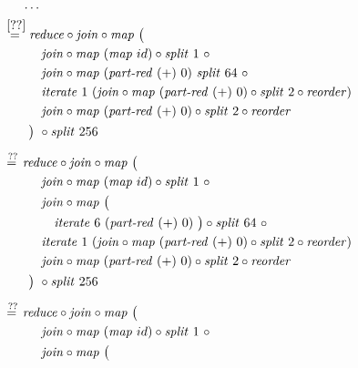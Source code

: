\begin{figure*}[t]
\begin{align*}
  &\hspace{.5em}\ldots\\
%
  &\hspace{-2em}\quad\begin{aligned}
    &\overset{\ref{??}}{=\hspace{.2em}}
      \reduce \circ \join \circ \map\ \big(\\
    &\qquad\quad\join \circ \map\ (\map\ id) \circ \splitN\ 1\ \circ\\
    &\qquad\quad\join \circ \map\ (\partRed\ (+)\ 0)\ \splitN\ 64\ \circ\\
    &\qquad\quad\iterateN\ 1\ (\join \circ \map\ (\partRed\ (+)\ 0) \circ \splitN\ 2\circ \reorder)\\
    &\qquad\quad\join \circ \map\ (\partRed\ (+)\ 0) \circ \splitN\ 2\circ \reorder\\
    &\qquad\big)\ \circ \splitN\ 256
  \end{aligned}\\[.5em]
%
  &\hspace{-2em}\quad\begin{aligned}
    &\overset{??}{=\hspace{.2em}}
      \reduce \circ \join \circ \map\ \big(\\
    &\qquad\quad\join \circ \map\ (\map\ id) \circ \splitN\ 1\ \circ\\
    &\qquad\quad\join \circ \map\ \big(\\
    &\qquad\qquad \iterateN\ 6\ (\partRed\ (+)\ 0)\ \big)\circ \splitN\ 64\ \circ\\
    &\qquad\quad\iterateN\ 1\ (\join \circ \map\ (\partRed\ (+)\ 0) \circ \splitN\ 2\circ \reorder)\\
    &\qquad\quad\join \circ \map\ (\partRed\ (+)\ 0) \circ \splitN\ 2\circ \reorder\\
    &\qquad\big)\ \circ \splitN\ 256
  \end{aligned}\\[.5em]
%
  &\hspace{-2em}\quad\begin{aligned}
    &\overset{??}{=\hspace{.2em}}
      \reduce \circ \join \circ \map\ \big(\\
    &\qquad\quad\join \circ \map\ (\map\ id) \circ \splitN\ 1\ \circ\\
    &\qquad\quad\join \circ \map\ \big(\\

\end{aligned}
\end{align*}
\end{figure*}
